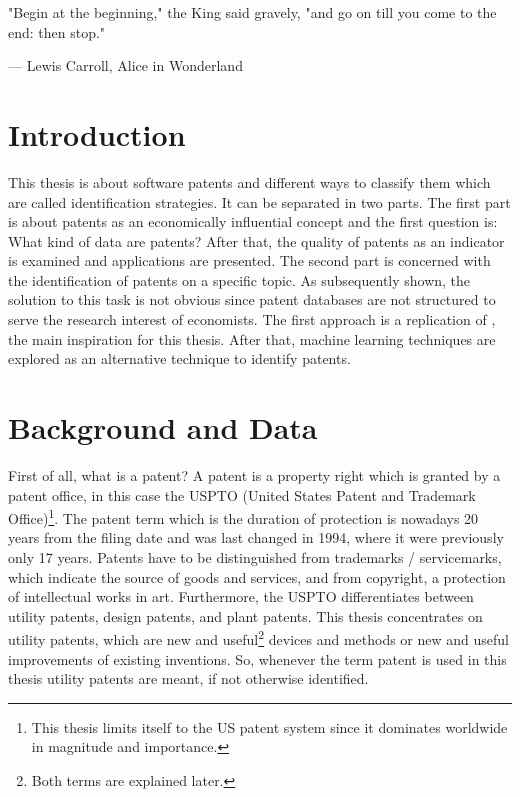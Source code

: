 \documentclass[12pt, a4paper]{scrartcl}
\theoremstyle{definition}
\begin{document}
\newpage
{}

\epigraph{"Begin at the beginning," the King said gravely, "and go on till you
come to the end: then stop."}{--- \textup{Lewis Carroll}, Alice in Wonderland}

\section{Introduction}
\label{sec:introduction}

This thesis is about software patents and different ways to classify them which
are called identification strategies. It can be separated in two parts. The
first part is about patents as an economically influential concept and the
first question is: What kind of data are patents? After that, the quality of
patents as an indicator is examined and applications are presented. The second
part is concerned with the identification of patents on a specific topic. As
subsequently shown, the solution to this task is not obvious since patent
databases are not structured to serve the research interest of economists. The
first approach is a replication of \citet{bessen2007empirical}, the main
inspiration for this thesis. After that, machine learning techniques are
explored as an alternative technique to identify patents.


\section{Background and Data} %
\label{sec:background_and_data}

First of all, what is a patent? A patent is a property right which is granted
by a patent office, in this case the USPTO (United States Patent and Trademark
Office)\footnote{This thesis limits itself to the US patent system since it
dominates worldwide in magnitude and importance.}. The patent term which is the
duration of protection is nowadays 20 years from the filing date and was last
changed in 1994, where it were previously only 17 years. Patents have to be
distinguished from trademarks / servicemarks, which indicate the source of
goods and services, and from copyright, a protection of intellectual works in
art. Furthermore, the USPTO differentiates between utility patents, design
patents, and plant patents. This thesis concentrates on utility patents, which
are new and useful\footnote{Both terms are explained later.} devices and
methods or new and useful improvements of existing inventions. So, whenever the
term patent is used in this thesis utility patents are meant, if not otherwise
identified.
\end{document}
